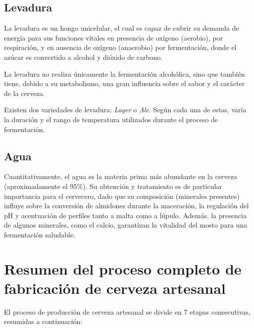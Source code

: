         \subsection{Levadura}
            \par La levadura es un hongo unicelular, el cual es capaz de cubrir su demanda de energía para sus funciones vitales en presencia de oxígeno (aerobio), por respiración, y en ausencia de oxígeno (anaerobio) por fermentación, donde el azúcar es convertido a alcohol y dióxido de carbono.
            
            \par La levadura no realiza únicamente la fermentación alcohólica, sino que también tiene, debido a su metabolismo, una gran influencia sobre el sabor y el carácter de la cerveza.
            
            \par Existen dos variedades de levadura: \textit{Lager} o \textit{Ale}. Según cada una de estas, varía la duración y el rango de temperatura utilizados durante el proceso de fermentación.
            
        \subsection{Agua}
            \par Cuantitativamente, el agua es la materia prima más abundante en la cerveza (aproximadamente el 95\%). Su obtención y tratamiento es de particular importancia para el cervecero, dado que su composición (minerales presentes) influye sobre la conversión de almidones durante la maceración, la regulación del pH y acentuación de perfiles tanto a malta como a lúpulo. Además, la presencia de algunos minerales, como el calcio, garantizan la vitalidad del mosto para una fermentación saludable.
            
    \section{Resumen del proceso completo de fabricación de cerveza artesanal}
        \par El proceso de producción de cerveza artesanal se divide en 7 etapas consecutivas, resumidas a continuación:
        
